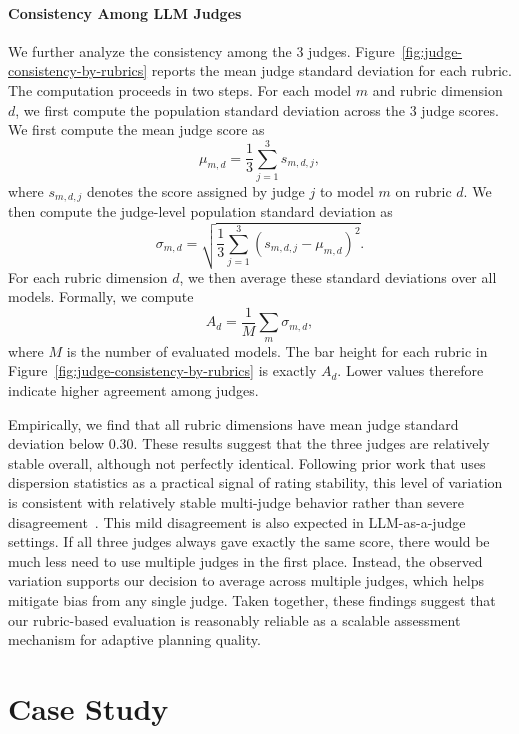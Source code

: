 \paragraph{Consistency Among LLM Judges}
We further analyze the consistency among the 3 judges.
Figure~\ref{fig:judge-consistency-by-rubrics} reports the mean judge standard deviation for each rubric.
The computation proceeds in two steps.
For each model $m$ and rubric dimension $d$, we first compute the population standard deviation across the 3 judge scores.
We first compute the mean judge score as
\[
\mu_{m,d} = \frac{1}{3} \sum_{j=1}^{3} s_{m,d,j},
\]
where $s_{m,d,j}$ denotes the score assigned by judge $j$ to model $m$ on rubric $d$.
We then compute the judge-level population standard deviation as
\[
\sigma_{m,d} = \sqrt{\frac{1}{3} \sum_{j=1}^{3} \left(s_{m,d,j} - \mu_{m,d}\right)^2 }.
\]
For each rubric dimension $d$, we then average these standard deviations over all models.
Formally, we compute
\[
A_d = \frac{1}{M} \sum_{m} \sigma_{m,d},
\]
where $M$ is the number of evaluated models.
The bar height for each rubric in Figure~\ref{fig:judge-consistency-by-rubrics} is exactly $A_d$.
Lower values therefore indicate higher agreement among judges.


Empirically, we find that all rubric dimensions have mean judge standard deviation below 0.30.
These results suggest that the three judges are relatively stable overall, although not perfectly identical.
Following prior work that uses dispersion statistics as a practical signal of rating stability, this level of variation is consistent with relatively stable multi-judge behavior rather than severe disagreement~\citep{chang2025development,Wei2025,alakaloko2019determination}.
This mild disagreement is also expected in LLM-as-a-judge settings.
If all three judges always gave exactly the same score, there would be much less need to use multiple judges in the first place.
Instead, the observed variation supports our decision to average across multiple judges, which helps mitigate bias from any single judge.
Taken together, these findings suggest that our rubric-based evaluation is reasonably reliable as a scalable assessment mechanism for adaptive planning quality.





\section{Case Study}
\label{app:case-error-study}

